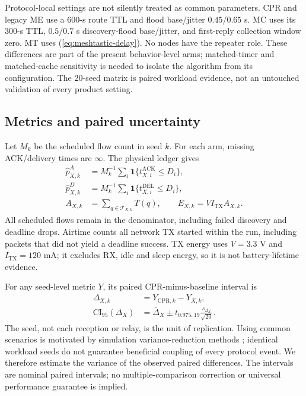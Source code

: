\documentclass[conference,letterpaper,10pt]{IEEEtran}
\begin{document}
Protocol-local settings are not silently treated as common parameters.
CPR and legacy ME use a 600-s route TTL and flood base/jitter
$0.45/0.65$ s. MC uses its 300-s TTL, $0.5/0.7$ s discovery-flood
base/jitter, and first-reply collection window zero.
MT uses (\ref{eq:meshtastic-delay}). No nodes have the repeater role.
These differences are part of the present behavior-level arms; matched-timer
and matched-cache sensitivity is needed to isolate the algorithm from its
configuration. The 20-seed matrix is paired workload evidence, not an
untouched validation of every product setting.

\subsection{Metrics and paired uncertainty}
Let $M_k$ be the scheduled flow count in seed $k$.
For each arm, missing ACK/delivery times are $\infty$.
The physical ledger gives
\begin{equation}
\begin{aligned}
\widehat p_{X,k}^{A}
 &=M_k^{-1}\sum_i\mathbf 1\{t_{X,i}^{\mathrm{ACK}}\leq D_i\},\\
\widehat p_{X,k}^{D}
 &=M_k^{-1}\sum_i\mathbf 1\{t_{X,i}^{\mathrm{DEL}}\leq D_i\},\\
A_{X,k}&=\sum_{q\in\mathcal T_{X,k}}T(q),\qquad
E_{X,k}=V I_{\mathrm{TX}} A_{X,k}.
\end{aligned}
\label{eq:ledger-metrics}
\end{equation}
All scheduled flows remain in the denominator, including failed discovery
and deadline drops. Airtime counts all network TX started within the run,
including packets that did not yield a deadline success.
TX energy uses $V=3.3$ V and $I_{\mathrm{TX}}=120$ mA; it excludes RX,
idle and sleep energy, so it is not battery-lifetime evidence.

For any seed-level metric $Y$, its paired CPR-minus-baseline interval is
\begin{equation}
\begin{aligned}
\Delta_{X,k}&=Y_{\mathrm{CPR},k}-Y_{X,k},\\
\mathrm{CI}_{95}(\Delta_X)
 &=\bar\Delta_X\pm t_{0.975,19}\frac{s_{\Delta_X}}{\sqrt{20}}.
\end{aligned}
\label{eq:paired-ci}
\end{equation}
The seed, not each reception or relay, is the unit of replication.
Using common scenarios is motivated by simulation variance-reduction
methods \cite{glasserman1992crn}; identical workload seeds do not guarantee
beneficial coupling of every protocol event. We therefore estimate the
variance of the observed paired differences.
The intervals are nominal paired intervals; no multiple-comparison
correction or universal performance guarantee is implied.
\end{document}
